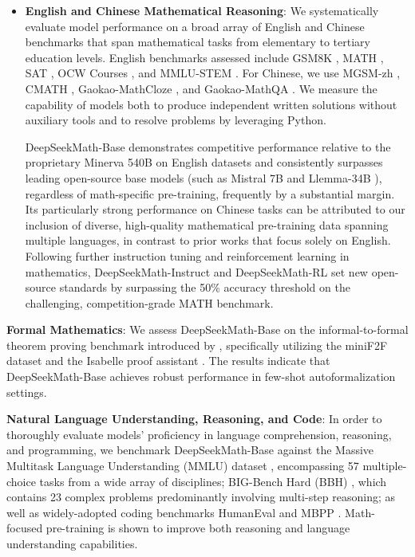 \begin{itemize}[topsep=0pt]
    \item \textbf{English and Chinese Mathematical Reasoning}: We systematically evaluate model performance on a broad array of English and Chinese benchmarks that span mathematical tasks from elementary to tertiary education levels. English benchmarks assessed include GSM8K \citep{gsm8k}, MATH \citep{MATH}, SAT \citep{llemma}, OCW Courses \citep{minerva}, and MMLU-STEM \citep{mmlu}. For Chinese, we use MGSM-zh \citep{mgsm}, CMATH \citep{wei2023cmath}, Gaokao-MathCloze \citep{agieval}, and Gaokao-MathQA \citep{agieval}. We measure the capability of models both to produce independent written solutions without auxiliary tools and to resolve problems by leveraging Python.
    
    DeepSeekMath-Base demonstrates competitive performance relative to the proprietary Minerva 540B \citep{minerva} on English datasets and consistently surpasses leading open-source base models (such as Mistral 7B \citep{mistral} and Llemma-34B \citep{llemma}), regardless of math-specific pre-training, frequently by a substantial margin. Its particularly strong performance on Chinese tasks can be attributed to our inclusion of diverse, high-quality mathematical pre-training data spanning multiple languages, in contrast to prior works \citep{minerva,llemma} that focus solely on English. Following further instruction tuning and reinforcement learning in mathematics, DeepSeekMath-Instruct and DeepSeekMath-RL set new open-source standards by surpassing the 50\% accuracy threshold on the challenging, competition-grade MATH benchmark.
\end{itemize}

\item \textbf{Formal Mathematics}: We assess DeepSeekMath-Base on the informal-to-formal theorem proving benchmark introduced by \citep{dsp_proof}, specifically utilizing the miniF2F dataset \citep{minif2f} and the Isabelle proof assistant \citep{isabelle}. The results indicate that DeepSeekMath-Base achieves robust performance in few-shot autoformalization settings.

\item \textbf{Natural Language Understanding, Reasoning, and Code}: In order to thoroughly evaluate models' proficiency in language comprehension, reasoning, and programming, we benchmark DeepSeekMath-Base against the Massive Multitask Language Understanding (MMLU) dataset \citep{mmlu}, encompassing 57 multiple-choice tasks from a wide array of disciplines; BIG-Bench Hard (BBH) \citep{bbh}, which contains 23 complex problems predominantly involving multi-step reasoning; as well as widely-adopted coding benchmarks HumanEval \citep{codex} and MBPP \citep{mbpp}. Math-focused pre-training is shown to improve both reasoning and language understanding capabilities.

